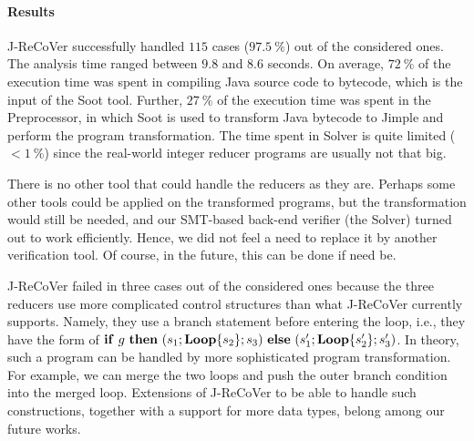 \documentclass{llncs}
\newcommand{\ite}[3]{
	 \ifmmode
	 \mathbf{if}\ #1 \ \mathbf{then}\ #2\  \mathbf{else}\ #3
	 \else
	 \textbf{if}\ #1 \ \textbf{then}\ #2\  \textbf{else}\ #3
	 \fi}
\newcommand{\rloop}{
	\ifmmode
	\mathbf{Loop}
	\else
	\textbf{Loop}
	\fi}
\begin{document}
\paragraph*{Results} 

J-ReCoVer successfully handled $115$ cases ($97.5~\%$) out of the considered
ones. The analysis time ranged between $9.8$ and $8.6$ seconds. On average,
$72~\%$ of the execution time was spent in compiling Java source code to
bytecode, which is the input of the Soot tool. Further, $27~\%$ of the execution
time was spent in the Preprocessor, in which Soot is used to transform Java
bytecode to Jimple and perform the program transformation. The time spent in
Solver is quite limited ($<1~\%$) since the real-world integer reducer programs
are usually not that big. 

There is no other tool that could handle the reducers as they are. Perhaps some
other tools could be applied on the transformed programs, but the
transformation would still be needed, and our SMT-based back-end verifier (the
Solver) turned out to work efficiently. Hence, we did not feel a need to replace
it by another verification tool. Of course, in the future, this can be done if
need be.

J-ReCoVer failed in three cases out of the considered ones because the three
reducers use more complicated control structures than what J-ReCoVer currently
supports. Namely, they use a branch statement before entering the loop, i.e.,
they have the form of
$\ite{g}{(s_1;\rloop\{s_2\};s_3)}{(s'_1;\rloop\{s'_2\};s'_3)}$. In theory, such
a program can be handled by more sophisticated program transformation. For
example, we can merge the two loops and push the outer branch condition into the
merged loop. Extensions of J-ReCoVer to be able to handle such constructions,
together with a support for more data types, belong among our future works.

\end{document}
